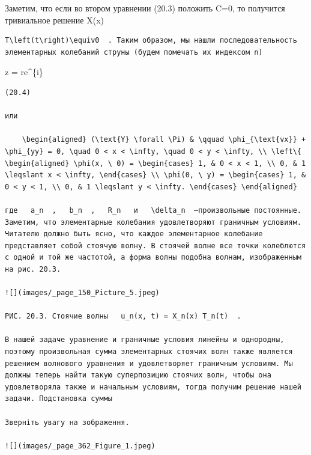 \documentclass[
  ukrainian,
]{article}
\begin{document}
Заметим, что если во втором уравнении (20.3) положить C=0, то получится
тривиальное решение X\left(x\right)

\begin{verbatim}
T\left(t\right)\equiv0  . Таким образом, мы нашли последовательность элементарных колебаний струны (будем помечать их индексом n)
\end{verbatim}

z = re\^{}\{i\theta\}

\begin{verbatim}
(20.4)

или

    \begin{aligned} (\text{Y} \forall \Pi) & \qquad \phi_{\text{vx}} + \phi_{yy} = 0, \quad 0 < x < \infty, \quad 0 < y < \infty, \\ \left\{ \begin{aligned} \phi(x, \ 0) = \begin{cases} 1, & 0 < x < 1, \\ 0, & 1 \leqslant x < \infty, \end{cases} \\ \phi(0, \ y) = \begin{cases} 1, & 0 < y < 1, \\ 0, & 1 \leqslant y < \infty. \end{cases} \end{aligned}

где   a_n  ,   b_n  ,   R_n   и   \delta_n  —произвольные постоянные. Заметим, что элементарные колебания удовлетворяют граничным условиям. Читателю должно быть ясно, что каждое элементарное колебание представляет собой стоячую волну. В стоячей волне все точки колеблются с одной и той же частотой, а форма волны подобна волнам, изображенным на рис. 20.3.

![](images/_page_150_Picture_5.jpeg)

РИС. 20.3. Стоячие волны   u_n(x, t) = X_n(x) T_n(t)  .

В нашей задаче уравнение и граничные условия линейны и однородны, поэтому произвольная сумма элементарных стоячих волн также является решением волнового уравнения и удовлетворяет граничным условиям. Мы должны теперь найти такую суперпозицию стоячих волн, чтобы она удовлетворяла также и начальным условиям, тогда получим решение нашей задачи. Подстановка суммы

Зверніть увагу на зображення.

![](images/_page_362_Figure_1.jpeg)


\end{verbatim}
\end{document}
